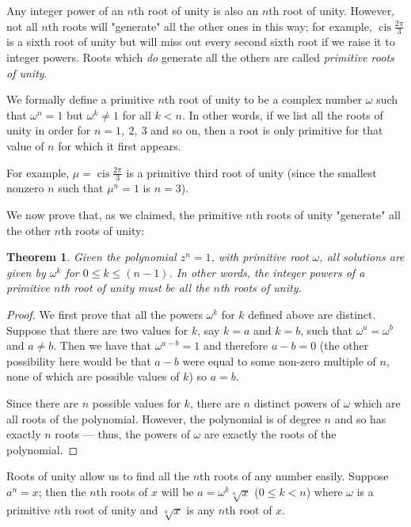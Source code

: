 \documentclass[a4paper,10pt,titlepage]{article}
\newtheorem*{thm}{Theorem}
\theoremstyle{definition}
\DeclareMathOperator{\cis}{cis}
\begin{document}
Any integer power of an $n$th root of unity is also an $n$th root of unity. However, not
all $ n$th roots will "generate" all the other ones in this way; for example, $ \cis \frac{2\pi}{3} $
is a sixth root of unity but will miss out every second sixth root if we raise it to integer
powers. Roots which \emph{do} generate all the others are called \emph{primitive roots of unity}.

We formally define a primitive $n$th root of unity to be a complex number $ \omega $ such that $ \omega^n = 1$
but $ \omega^k \neq 1 $ for all $ k < n $. In other words, if we list all the roots of unity in order for $ n = 1,~2,~3 $
and so on, then a root is only primitive for that value of $ n $ for which it first appears.

For example, $ \mu = \cis \frac{2\pi}{3} $ is a primitive third root of unity (since the smallest
nonzero $ n $ such that $ \mu^n = 1 $ is $ n = 3 $).

\clearpage
We now prove that, as we claimed, the primitive $n$th roots of unity "generate" all the other
$ n$th roots of unity:
\begin{thm}
  Given the polynomial $ z^n = 1 $, with primitive root $ \omega $, all solutions
  are given by $ \omega^k $ for $ 0 \leq k \leq (n - 1) $. In other words,
  the integer powers of a primitive $ n$th root of unity must be \emph{all} the
  $n$th roots of unity.
\end{thm}

\begin{proof}
  We first prove that all the powers $ \omega^k $ for $ k $ defined above are distinct.
  Suppose that there are two values for $ k $, say
  $ k = a $ and $ k = b $, such that $ \omega^a = \omega^b $ and $ a \neq b $. Then we have
  that $ \omega^{a-b} = 1 $ and therefore $ a - b = 0 $ (the other possibility here would be
  that $ a - b $ were equal to some non-zero multiple of $ n $, none of which are possible
  values of $ k $) so $ a = b $.

  Since there are $ n $ possible values for $ k $, there are $ n $ distinct powers of $ \omega $
  which are all roots of the polynomial. However, the polynomial is of degree $ n $ and so has
  exactly $ n $ roots --- thus, the powers of $ \omega $ are exactly the roots of the polynomial.
\end{proof}

Roots of unity allow us to find all the $ n$th roots of any number easily. Suppose $ a^n = x $; then
the $ n$th roots of $ x $ will be $ a = \omega^k \sqrt[n]{x} $ ($ 0 \leq k < n $) where $ \omega $ is a
primitive $ n$th root of unity and $ \sqrt[n]{x} $ is any $ n$th root of $ x $.
\end{document}
